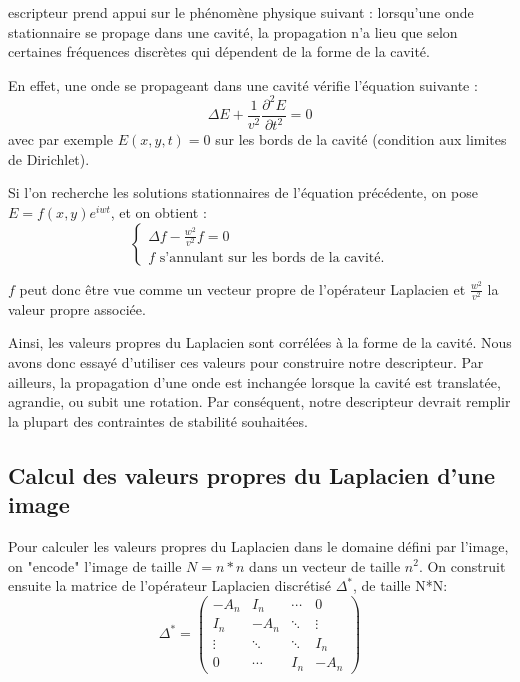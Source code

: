 \documentclass[a4paper,10pt]{article} %
\theoremstyle{definition} %
\begin{document}
escripteur prend appui sur le phénomène physique suivant : lorsqu'une onde stationnaire se propage dans une cavité, la propagation n'a lieu que selon certaines fréquences discrètes qui dépendent de la forme de la cavité.

En effet, une onde se propageant dans une cavité vérifie l'équation suivante : $$\Delta E + \frac{1}{v^2} \frac{\partial^2 E}{\partial t^2} = 0$$ avec par exemple $E(x,y,t) = 0$ sur les bords de la cavité (condition aux limites de Dirichlet).

Si l'on recherche les solutions stationnaires de l'équation précédente, on pose $E = f(x,y)e^{iwt}$, et on obtient : 
\begin{equation}
\left\{ 
  \begin{array}{l}
 \Delta f  - \frac{w^2}{v^2} f = 0 \\
 f  \text{ s'annulant sur les bords de la cavité.} 
   \end{array} \right.
 \label{eigen}
 \end{equation}

$f$ peut donc être vue comme un vecteur propre de l'opérateur Laplacien et $\frac{w^2}{v^2}$ la valeur propre associée.

Ainsi, les valeurs propres du Laplacien sont corrélées à la forme de la cavité. Nous avons donc essayé d'utiliser ces valeurs pour construire notre descripteur. Par ailleurs, la propagation d'une onde est inchangée lorsque la cavité est translatée, agrandie, ou subit une rotation. Par conséquent, notre descripteur devrait remplir la plupart des contraintes de stabilité souhaitées.


  \subsection{Calcul des valeurs propres du Laplacien d'une image}

Pour calculer les valeurs propres du Laplacien dans le domaine défini par l'image, on "encode" l'image de taille $N = n*n$ dans un vecteur de taille $n^2$.
On construit ensuite la matrice de l'opérateur Laplacien discrétisé $\Delta^*$, de taille N*N: 
$$
\Delta^* =
 \begin{pmatrix}
  -A_n & I_n & \cdots & 0 \\
  I_n & -A_n & \ddots &   \vdots \\
  \vdots  & \ddots  & \ddots & I_n  \\
  0 & \cdots  & I_n & -A_n
 \end{pmatrix}
$$
\end{document}
